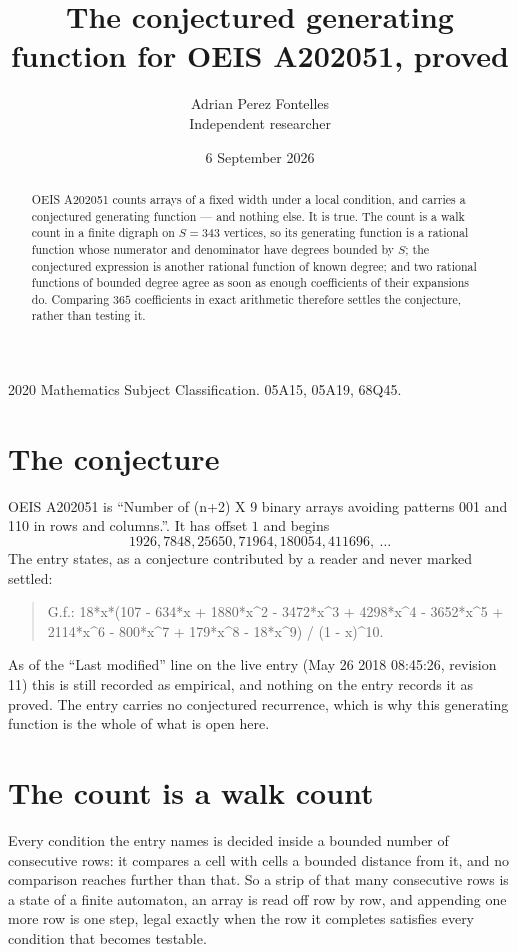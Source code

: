 \documentclass[11pt,a4paper]{article}
\title{The conjectured generating function for OEIS A202051, proved}
\author{Adrian Perez Fontelles\\ \small Independent researcher}
\date{6 September 2026}
\theoremstyle{plain}
\theoremstyle{definition}
\begin{document}
\maketitle

\begin{abstract}
OEIS A202051 counts arrays of a fixed width under a local condition, and carries a conjectured
generating function --- and nothing else. It is true. The count is a walk count in a finite
digraph on $S=343$ vertices, so its generating function is a rational function whose numerator
and denominator have degrees bounded by $S$; the conjectured expression is another rational
function of known degree; and two rational functions of bounded degree agree as soon as enough
coefficients of their expansions do. Comparing $365$ coefficients in exact arithmetic
therefore settles the conjecture, rather than testing it.
\end{abstract}

\noindent\small 2020 Mathematics Subject Classification. 05A15, 05A19, 68Q45.\normalsize

\section{The conjecture}

OEIS A202051 is ``Number of (n+2) X 9 binary arrays avoiding patterns 001 and 110 in rows and columns.''. It has offset $1$ and begins
\[
1926, 7848, 25650, 71964, 180054, 411696,\ \dots
\]
The entry states, as a conjecture contributed by a reader and never marked settled:
\begin{quote}
G.f.: 18*x*(107 - 634*x + 1880*x\^{}2 - 3472*x\^{}3 + 4298*x\^{}4 - 3652*x\^{}5 + 2114*x\^{}6 - 800*x\^{}7 + 179*x\^{}8 - 18*x\^{}9) / (1 - x)\^{}10.
\end{quote}
As of the ``Last modified'' line on the live entry (May 26 2018 08:45:26, revision 11) this is still
recorded as empirical, and nothing on the entry records it as proved. The entry carries no
conjectured recurrence, which is why this generating function is the whole of what is open
here.

\section{The count is a walk count}

Every condition the entry names is decided inside a bounded number of consecutive rows: it
compares a cell with cells a bounded distance from it, and no comparison reaches further than
that. So a strip of that many consecutive rows is a state of a finite automaton, an array is
read off row by row, and appending one more row is one step, legal exactly when the row it
completes satisfies every condition that becomes testable.
\end{document}
